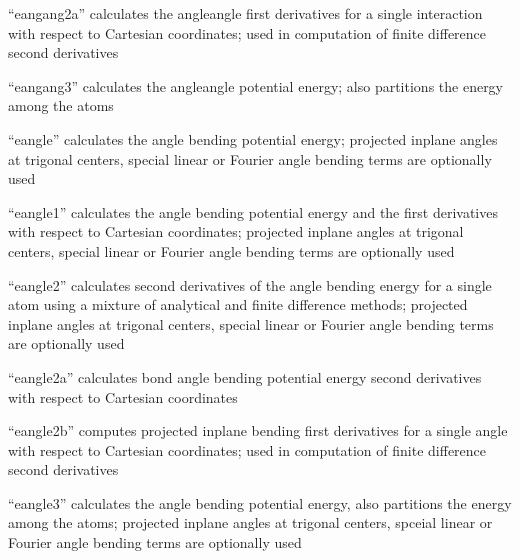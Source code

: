 \documentclass[letterpaper,11pt,english]{sphinxmanual}
\begin{document}

“eangang2a” calculates the angle\sphinxhyphen{}angle first derivatives for
a single interaction with respect to Cartesian coordinates;
used in computation of finite difference second derivatives


“eangang3” calculates the angle\sphinxhyphen{}angle potential energy;
also partitions the energy among the atoms


“eangle” calculates the angle bending potential energy;
projected in\sphinxhyphen{}plane angles at trigonal centers, special
linear or Fourier angle bending terms are optionally used


“eangle1” calculates the angle bending potential energy and
the first derivatives with respect to Cartesian coordinates;
projected in\sphinxhyphen{}plane angles at trigonal centers, special linear
or Fourier angle bending terms are optionally used


“eangle2” calculates second derivatives of the angle bending
energy for a single atom using a mixture of analytical and
finite difference methods; projected in\sphinxhyphen{}plane angles at trigonal
centers, special linear or Fourier angle bending terms are
optionally used


“eangle2a” calculates bond angle bending potential energy
second derivatives with respect to Cartesian coordinates


“eangle2b” computes projected in\sphinxhyphen{}plane bending first derivatives
for a single angle with respect to Cartesian coordinates;
used in computation of finite difference second derivatives


“eangle3” calculates the angle bending potential energy, also
partitions the energy among the atoms; projected in\sphinxhyphen{}plane
angles at trigonal centers, spceial linear or Fourier angle
bending terms are optionally used

\end{document}
